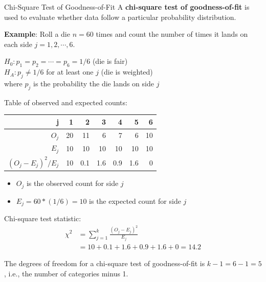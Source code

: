 \documentclass[10pt]{beamer}
\begin{document}

\begin{frame}{Chi-Square Test of Goodness-of-Fit}
A \textbf{chi-square test of goodness-of-fit} is used to evaluate whether data follow a particular probability distribution.\\
\vspace{20pt}

\textbf{Example}:   Roll a die $n=60$ times and count the number of times it lands on each side $j=1,2,\cdots,6$.\\
\vspace{10pt}

$H_0: p_1 = p_2 = \cdots = p_6 = 1/6$ (die is fair)\\ 
$H_A: p_j \neq 1/6$ for at least one $j$ (die is weighted)\\
\vspace{10pt}
where $p_j$ is the probability the die lands on side $j$
\end{frame}

\begin{frame}
Table of observed and expected counts:\\
\vspace{10pt}
\begin{tabular}{r|rrrrrr}
j & 1 & 2 & 3 & 4 & 5 & 6\\
\hline
$O_j$ & 20 & 11 & 6 & 7 & 6 & 10\\
$E_j$ & 10 & 10 & 10 & 10 & 10 & 10\\
$(O_j - E_j)^2/E_j$ & 10  & 0.1  & 1.6 & 0.9 & 1.6 & 0\\
\end{tabular}
\vspace{10pt}

\begin{itemize}
\item $O_j$ is the observed count for side $j$
\item $E_j = 60 * (1/6) = 10$ is the expected count for side $j$
\end{itemize}
\vspace{10pt}
\end{frame}

\begin{frame}
Chi-square test statistic:
\begin{align*}
\chi^2 &= \sum_{j=1}^k \frac{(O_j - E_j)^2}{E_j}\\ 
&= 10  + 0.1 + 1.6 + 0.9 + 1.6 + 0 = \boxed{14.2}
\end{align*}
\vspace{10pt}

The degrees of freedom for a chi-square test of goodness-of-fit is $k-1 = 6-1=5$, i.e., the number of categories minus 1.
\end{frame}
\end{document}
